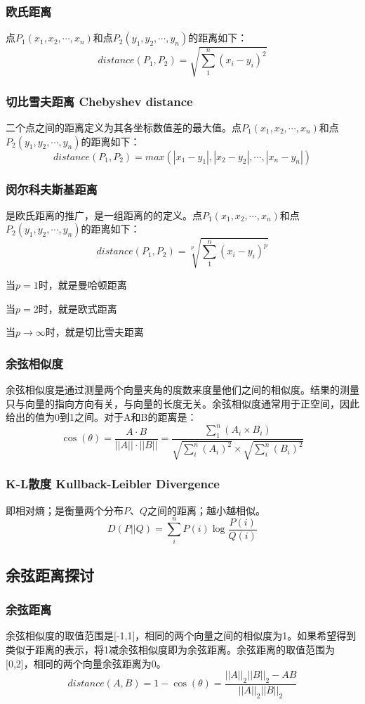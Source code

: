 \documentclass[12pt]{article}
\begin{document}
\subsubsection{欧氏距离}
点$P_1(x_1, x_2, \cdots, x_n)$和点$P_2(y_1, y_2, \cdots, y_n)$的距离如下：
$$
distance(P_1, P_2) = \sqrt{\sum_1^n(x_i-y_i)^2}
$$

\subsubsection{切比雪夫距离 Chebyshev distance}
二个点之间的距离定义为其各坐标数值差的最大值。点$P_1(x_1, x_2, \cdots, x_n)$和点$P_2(y_1, y_2, \cdots, y_n)$的距离如下：
$$
distance(P_1, P_2) = max(|x_1-y_1|, |x_2-y_2|, \cdots,|x_n-y_n|)
$$

\subsubsection{闵尔科夫斯基距离}
是欧氏距离的推广，是一组距离的的定义。点$P_1(x_1, x_2, \cdots, x_n)$和点$P_2(y_1, y_2, \cdots, y_n)$的距离如下：
$$
distance(P_1, P_2) = \sqrt[p]{\sum_1^n(x_i-y_i)^p}
$$

当$p=1$时，就是曼哈顿距离

当$p=2$时，就是欧式距离

当$p\rightarrow \infty$时，就是切比雪夫距离

\subsubsection{余弦相似度}
余弦相似度是通过测量两个向量夹角的度数来度量他们之间的相似度。结果的测量只与向量的指向方向有关，与向量的长度无关。余弦相似度通常用于正空间，因此给出的值为0到1之间。对于A和B的距离是：
$$
\cos(\theta) = \frac{A\cdot B}{||A||\cdot||B||} = \frac{\sum_1^n(A_i \times B_i)}{\sqrt{\sum_i^n(A_i)^2} \times \sqrt{\sum_i^n(B_i)^2}}
$$

\subsubsection{K-L散度 Kullback-Leibler Divergence}
即相对熵；是衡量两个分布$P$、$Q$之间的距离；越小越相似。
$$
D(P||Q) = \sum_i^nP(i) \log{\frac{P(i)}{Q(i)}}
$$

\subsection{余弦距离探讨\cite{Cosine_Distance}}
\subsubsection{余弦距离}
余弦相似度的取值范围是[-1,1]，相同的两个向量之间的相似度为1。如果希望得到类似于距离的表示，将1减余弦相似度即为余弦距离。余弦距离的取值范围为[0,2]，相同的两个向量余弦距离为0。
$$
distance(A,B) = 1 - \cos(\theta) = \frac{||A||_2||B||_2 - AB}{||A||_2||B||_2}
$$
\end{document}
